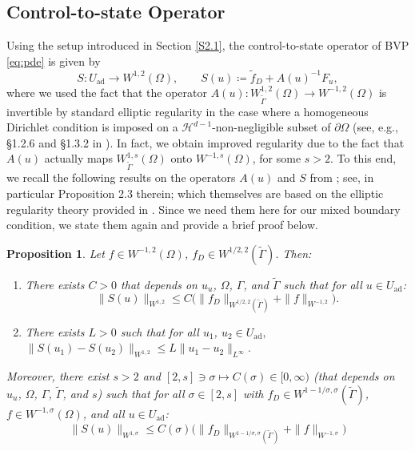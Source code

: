 \documentclass[11pt]{article}
\newcommand{\calH}{\mathcal{H}}
\newcommand{\feas}{U_{\textrm{ad}}}
\newtheorem{proposition}[theorem]{Proposition}
\theoremstyle{definition}
\theoremstyle{remark}
\begin{document}
\subsection{Control-to-state Operator}
%
Using the setup introduced in Section \ref{S2.1}, the control-to-state operator of BVP \eqref{eq:pde}
is given by
\begin{equation}\label{dfnS}
S:\feas\to W^{1,2}(\Omega),
\qquad 
S(u) \coloneqq \tilde f_D + A(u)^{-1}F_u,
\end{equation}
where we used the fact that the operator  $A(u):W^{1,2}_{\tilde\Gamma}(\Omega)\to W^{-1,2}(\Omega) $
is invertible by standard elliptic regularity in the case where  a homogeneous Dirichlet
condition is imposed on a $\calH^{d-1}$-non-negligible subset
of $\partial \Omega$ (see, e.g.,
\S1.2.6 and \S1.3.2 in \cite{necas2011direct}). In fact, we obtain improved regularity  due to the fact that $A(u)$ 
actually maps  $W^{1,s}_{\tilde\Gamma}(\Omega)$ onto 
$W^{-1,s}(\Omega)$, for some $s > 2$. To this end, we recall the following results on the operators $A(u)$ and $S$ from \cite{clason2018total}; see, in particular
Proposition 2.3 therein; which themselves are based on the elliptic regularity theory provided in \cite{groger1989aw}. Since we need them
here for our mixed boundary condition, we state them again and provide a brief proof below.
%
\begin{proposition}\label{prp-new:elementary_properties}
Let $f\in W^{-1,2}(\Omega)$, $f_D\in W^{1/2,2}(\tilde\Gamma)$. Then:
%
\begin{enumerate}
\item There exists $C>0$ that depends on $u_u$, $\Omega$,
$\Gamma$, and $\tilde{\Gamma}$ such that for all $u \in \feas$:
\[
\|S(u)\|_{W^{1,2}} \le C\bigl(\|f_D\|_{W^{1/2,2}(\tilde\Gamma)} + 
\|f\|_{W^{-1,2}}\bigr).
\]
\item There exists $L>0$ such that for all $u_1$, $u_2 \in \feas,$ $\|S(u_1)-S(u_2)\|_{W^{1,2}} \le L\|u_1-u_2\|_{L^\infty}. $\end{enumerate}
%
Moreover, there exist $s>2$ and $[2,s] \ni \sigma \mapsto C(\sigma) \in [0,\infty)$ (that depends on $u_u$, $\Omega$, $\Gamma$, $\tilde{\Gamma}$, and $s$)
such that for all $\sigma \in [2,s]$ with $f_D\in W^{1-1/\sigma,\sigma}(\tilde\Gamma)$, $f \in W^{-1,\sigma}(\Omega)$, and all $u \in \feas$:
%
\begin{gather}\label{eq:w1s_estimate}
    \|S(u)\|_{W^{1,\sigma}}
\le C(\sigma)\bigl(\|f_D\|_{W^{1-1/\sigma,\sigma}(\tilde{\Gamma})} + \|f\|_{W^{-1,\sigma}}\bigr)
\end{gather}
\end{proposition}
\end{document}
